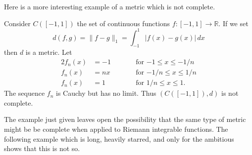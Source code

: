 Here is a more interesting example of a metric which 
is not complete.
\begin{example}\label{one norm} 
Consider $C([-1,1])$ the set of continuous
functions $f:[-1,1]\rightarrow{\mathbb R}$. If we set
\[d(f,g)=\|f-g\|_{1}=\int_{-1}^{1}|f(x)-g(x)|\,dx\]
then $d$ is a metric. Let
\begin{alignat*}{2}
f_{n}(x)&=-1&&\qquad\text{for $-1\leq x\leq -1/n$}\\
f_{n}(x)&=nx&&\qquad\text{for $-1/n\leq x\leq 1/n$}\\
f_{n}(x)&=1&&\qquad\text{for $1/n\leq x\leq 1$}.
\end{alignat*}
The sequence $f_{n}$ is Cauchy but has no limit.
Thus $(C([-1,1]),d)$ is not complete.
\end{example}

The example just given leaves open the possibility
that the same type of metric might be be complete
when applied to Riemann integrable functions.
The following example which is long, heavily starred,
and only for the ambitious shows that this is not so.
